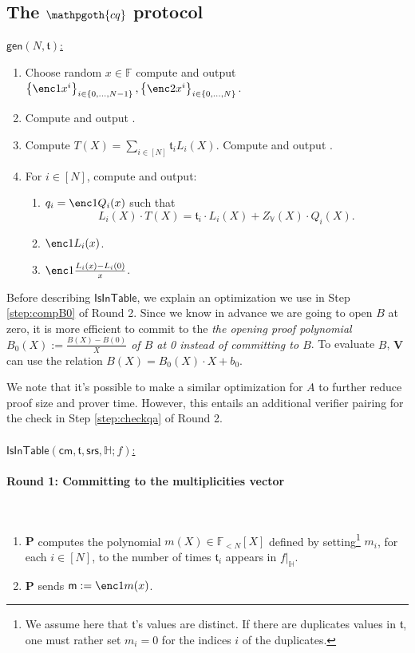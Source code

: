 \documentclass[11pt]{article} %
\newcommand{\cq}{\ensuremath{\mathpgoth{cq} }\xspace}
\newcommand{\F}{\ensuremath{\mathbb F}\xspace}
\newcommand{\srs}{\ensuremath{\mathsf{srs}}\xspace}
\newcommand{\cm}{\ensuremath{\mathsf{cm}}\xspace}
\newcommand{\defeq}{:=}
\newcommand{\sett}[2]{\ensuremath{\set{#1}_{#2}}\xspace}
\newcommand{\gen}{\ensuremath{\mathsf{gen}}\xspace}
\newcommand{\prv}{\ensuremath{\mathsf{\mathbf{P}}}\xspace}
\newcommand{\ver}{\ensuremath{\mathsf{\mathbf{V}}}\xspace}
\newcommand{\set}[1]{\ensuremath{\left\{#1\right\}}\xspace}
\newcommand{\polysofdeg}[1]{\ensuremath{\F_{< #1}[X]}\xspace}
\newcommand{\sumi}[1]{\sum_{i\in[#1]}}
\newcommand{\restricttoset}[2]{\ensuremath{#1|_{#2}}\xspace}
\newcommand{\isintable}{\ensuremath{\mathsf{IsInTable}}\xspace}
\newcommand{\subspace}{\ensuremath{\mathbb{H}}\xspace}
\newcommand{\bigspace}{\ensuremath{\mathbb{V}}\xspace}
\newcommand{\tabsize}{\ensuremath{N}\xspace}
\newcommand{\tab}{\ensuremath{\mathfrak{t}}\xspace}
\newcommand{\m}{\ensuremath{\mathsf{m}}\xspace}
\begin{document}
\subsection{The \cq protocol}

\underline{$\gen(\tabsize,\tab)$:}\\ \noindent
\begin{enumerate}
\item Choose random $x\in \F$ compute and output $\sett{\enc1{x^i}}{i\in \set{0,\ldots,\tabsize-1}},\sett{\enc2{x^i}}{i\in \set{0,\ldots,\tabsize}}$.
\item Compute and output \enc2{Z_\bigspace(x)}.
\item Compute $T(X)=\sumi{\tabsize}\tab_i L_i(X)$. Compute and output .
 \item For $i\in [\tabsize]$, compute and output:
 \begin{enumerate}
  \item $q_i=\enc1{Q_i(x)}$ such that
  \[L_i(X)\cdot T(X)=\tab_i\cdot L_i(X) + Z_\bigspace(X)\cdot Q_i(X).\]
  \item $\enc1{L_i(x)}$.
  \item $\enc1{\frac{L_i(x)-L_i(0)}{x}}$.
 \end{enumerate}

\end{enumerate}

Before describing \isintable, we explain an optimization we use in Step \ref{step:compB0} of Round 2. Since we know in advance we are going to open $B$ at zero, it is more efficient to commit to the \emph{the opening proof polynomial  $B_0(X)\defeq \frac{B(X)-B(0)}{X}$ of $B$ at 0 instead of committing to $B$}. To evaluate $B$, \ver can use the relation $B(X)=B_0(X)\cdot X + b_0$.

We note  that it's possible to make a similar optimization for $A$ to further reduce proof size and prover time. However, this entails an additional verifier pairing for the check in Step \ref{step:checkqa} of Round 2.
\noindent
\\
\\
\noindent
\underline{$\isintable(\cm,\tab,\srs,\subspace;f)$:} \\ \noindent
\paragraph{\textbf{Round 1:} Committing to the multiplicities vector} \ \\
\begin{enumerate}
 \item \prv computes the polynomial $m(X)\in \polysofdeg{\tabsize}$ defined by setting\footnote{We assume here that $\tab$'s values are distinct. If there are duplicates values in \tab, one must rather set $m_i=0$ for the indices $i$ of the duplicates.} $m_i$, for each $i\in [\tabsize]$, to the number of times $\tab_i$ appears in \restricttoset{f}{\subspace}.
 \item \prv sends $\m\defeq \enc1{m(x)}$.
 \end{enumerate}
\end{document}
